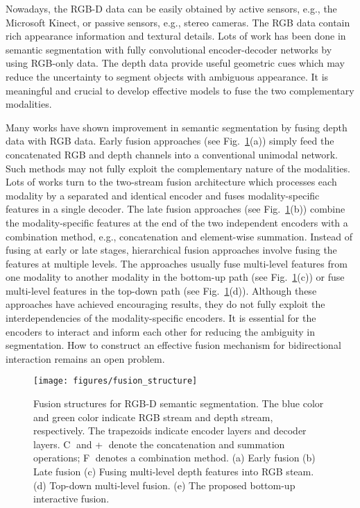 \documentclass[letterpaper, 10 pt, conference]{ieeeconf}
\begin{document}
	Nowadays, the RGB-D data can be easily obtained by active sensors, e.g., the Microsoft Kinect, or passive sensors, e.g., stereo cameras. The RGB data contain rich appearance information and textural details. Lots of work has been done in semantic segmentation with fully convolutional encoder-decoder networks by using RGB-only data\cite{ romera2017erfnet,chen2018encoder,zhao2016pyramid,deng2019restricted,deng2017cnn,yang2019can}. The depth data provide useful geometric cues which may reduce the uncertainty to segment objects with ambiguous appearance\cite{hazirbas2016fusenet}. It is meaningful and crucial to develop effective models to fuse the two complementary modalities.
	
	Many works have shown improvement in semantic segmentation by fusing depth data with RGB data\cite{couprie2013indoor,valada2016deep,cheng2017locality,hazirbas2016fusenet,park2017rdfnet,valada2019self}. Early fusion approaches (see Fig.~\ref{fig_fusion_structures}(a)) simply feed the concatenated RGB and depth channels into a conventional unimodal network\cite{couprie2013indoor}. Such methods may not fully exploit the complementary nature of the modalities\cite{ngiam2011multimodal}. Lots of works turn to the two-stream fusion architecture which processes each modality by a separated and identical encoder and fuses modality-specific features in a single decoder\cite{valada2016deep,valada2019self,cheng2017locality,park2017rdfnet,hazirbas2016fusenet}. The late fusion approaches\cite{valada2016deep, cheng2017locality} (see Fig.~\ref{fig_fusion_structures}(b)) combine the modality-specific features at the end of the two independent encoders with a combination method, e.g., concatenation and element-wise summation. Instead of fusing at early or late stages, hierarchical fusion approaches involve fusing the features at multiple levels. The approaches usually fuse multi-level features from one modality to another modality in the bottom-up path \cite{hazirbas2016fusenet}(see Fig.~\ref{fig_fusion_structures}(c)) or fuse multi-level features in the top-down path\cite{valada2019self, park2017rdfnet} (see Fig.~\ref{fig_fusion_structures}(d)).
	Although these approaches have achieved encouraging results, they do not fully exploit the interdependencies of the modality-specific encoders. It is essential for the encoders to interact and inform each other for reducing the ambiguity in segmentation. How to construct an effective fusion mechanism for bidirectional interaction remains an open problem.

	\begin{figure}[!tb]
		\centering
		\texttt{[image: figures/fusion\_structure]}
		\caption{Fusion structures for RGB-D semantic segmentation. The blue color and green color indicate RGB stream and depth stream, respectively. The trapezoids indicate encoder layers and decoder layers. \textcircled{\tiny C} and \textcircled{+} denote the concatenation and summation operations; \textcircled{\tiny F} denotes a combination method. (a) Early fusion (b) Late fusion (c) Fusing multi-level depth features into RGB steam. (d) Top-down multi-level fusion. (e) The proposed bottom-up interactive fusion.}
		\label{fig_fusion_structures}
	\end{figure}
	
\end{document}
